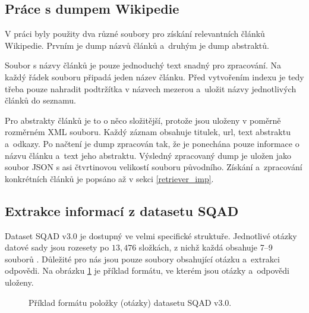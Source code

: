 \subsection{Práce s dumpem Wikipedie}
V práci byly použity dva různé soubory pro získání relevantních článků Wikipedie. Prvním je dump názvů článků a~druhým je dump abstraktů.\par
Soubor s názvy článků je pouze jednoduchý text snadný pro zpracování. Na každý řádek souboru připadá jeden název článku. Před vytvořením indexu je tedy třeba pouze nahradit podtržítka v názvech mezerou a~uložit názvy jednotlivých článků do seznamu.\par
Pro abstrakty článků je to o něco složitější, protože jsou uloženy v poměrně rozměrném XML souboru. Každý záznam obsahuje titulek, url, text abstraktu a~odkazy. Po načtení je dump zpracován tak, že je ponechána pouze informace o názvu článku a~text jeho abstraktu. Výsledný zpracovaný dump je uložen jako soubor JSON s asi čtvrtinovou velikostí souboru původního. Získání a~zpracování konkrétních článků je popsáno až v sekci \ref{retriever_imp}.

\subsection{Extrakce informací z datasetu SQAD}
Dataset SQAD v3.0 \cite{sqad_download} je dostupný ve velmi specifické struktuře. Jednotlivé otázky datové sady jsou rozesety po $13,476$ složkách, z nichž každá obsahuje 7--9 souborů . Důležité pro nás jsou pouze soubory obsahující otázku a~extrakci odpovědi. Na obrázku \ref{question_format} je příklad formátu, ve kterém jsou otázky a~odpovědi uloženy. 

\begin{figure}[hbt]
	\centering
	\caption{Příklad formátu položky (otázky) datasetu SQAD v3.0.}
	\label{question_format}
\end{figure}

